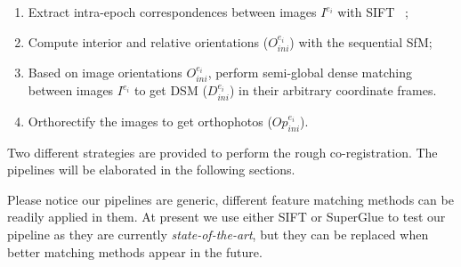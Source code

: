\begin{enumerate}
\item Extract intra-epoch correspondences between images $I^{e_i}$ with SIFT ~\cite{lowe2004distinctive};
\item Compute interior and relative orientations ({$O_{ini}^{e_i}$}) with the sequential SfM;
\item Based on image orientations $O_{ini}^{e_i}$, perform semi-global dense matching~\cite{mpd:06:sgm} {between images $I^{e_i}$} to get {DSM ($D_{ini}^{e_i}$) in their arbitrary coordinate frames.}
\item Orthorectify the images to get orthophotos ($Op_{ini}^{e_i}$).
\end{enumerate}

Two different strategies are provided to perform the rough co-registration. The pipelines will be elaborated in the following sections. 
\par
Please notice our pipelines are generic, different feature matching methods can be readily applied in them. At present we use either SIFT or SuperGlue to test our pipeline as they are currently \textit{state-of-the-art}, but they can be replaced when better matching methods appear in the future.\\
